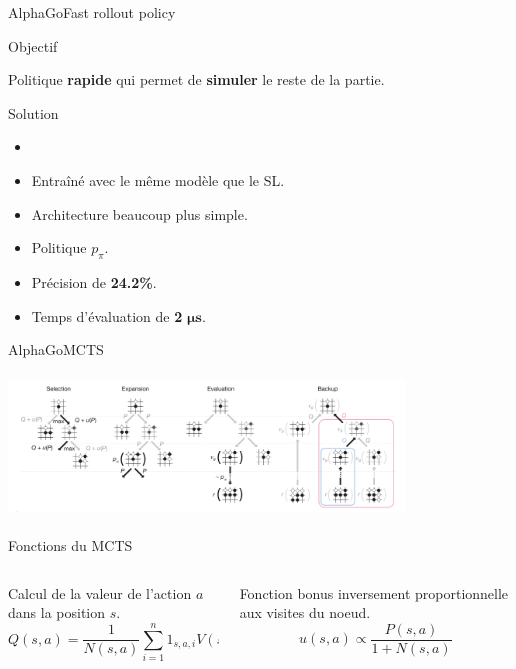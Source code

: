 \begin{frame}{AlphaGo}{Fast rollout policy}
    \begin{block}{Objectif}
        \begin{center}
            Politique \textbf{rapide} qui permet de \textbf{simuler} le reste de la partie.
        \end{center}
    \end{block}
    \begin{block}{Solution}
        \begin{itemize}
            \item
            \item Entraîné avec le même modèle que le SL.
            \item Architecture beaucoup plus simple.
            \item Politique $p_\pi$.
            \item Précision de \textbf{24.2\%}.
            \item Temps d'évaluation de \textbf{2} $\boldsymbol{\mu s}$.
        \end{itemize}
    \end{block}
\end{frame}


\begin{frame}{AlphaGo}{MCTS}
    \begin{center}
        \includegraphics[width=10.5cm, height=3.8cm]{ressources/AlphaGo/MCTS_AlphaGo}
        \begin{block}{ Fonctions du MCTS }
            \begin{columns}[t]
                \begin{column}{0.45\textwidth}
                    Calcul de la valeur de l'action $a$ dans la position $s$.
                    $$Q(s,a) = \frac{1}{N(s,a)}\sum\limits_{i=1}^{n} 1_{s,a,i} V(s_L)$$

                \end{column}
                \begin{column}{0.45\textwidth}
                    Fonction bonus inversement proportionnelle aux visites du noeud.
                    $$u(s,a) \propto \frac{P(s,a)}{1+N(s,a)}$$
                \end{column}
            \end{columns}
        \end{block}
    \end{center}
\end{frame}


